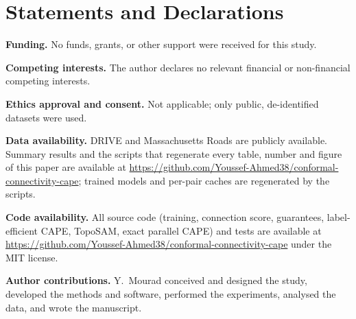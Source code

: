 \documentclass[10pt,letterpaper,journal]{IEEEtran}
\newcommand{\1}{\mathbf{1}}
\begin{document}
\section*{Statements and Declarations}
\noindent\textbf{Funding.} No funds, grants, or other support were received for this study.\par
\noindent\textbf{Competing interests.} The author declares no relevant financial or non-financial competing interests.\par
\noindent\textbf{Ethics approval and consent.} Not applicable; only public, de-identified datasets were used.\par
\noindent\textbf{Data availability.} DRIVE and Massachusetts Roads are publicly available. Summary results and the scripts that regenerate every table, number and figure of this paper are available at \url{https://github.com/Youssef-Ahmed38/conformal-connectivity-cape}; trained models and per-pair caches are regenerated by the scripts.\par
\noindent\textbf{Code availability.} All source code (training, connection score, guarantees, label-efficient CAPE, TopoSAM, exact parallel CAPE) and tests are available at \url{https://github.com/Youssef-Ahmed38/conformal-connectivity-cape} under the MIT license.\par
\noindent\textbf{Author contributions.} Y.~Mourad conceived and designed the study, developed the methods and software, performed the experiments, analysed the data, and wrote the manuscript.\par
\end{document}
